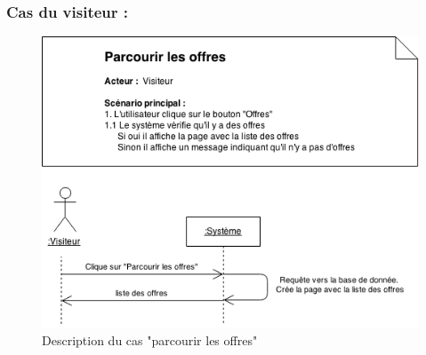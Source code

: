 \documentclass[12pt]{report}
\begin{document}
\subsubsection{Cas du visiteur :}
\begin{figure}[h]
\centering
\includegraphics[width=1.\textwidth]{./ressources/desc_UC_parcourir_offres.png}
\caption{Description du cas "parcourir les offres"}
\end{figure}
\clearpage
\end{document}
